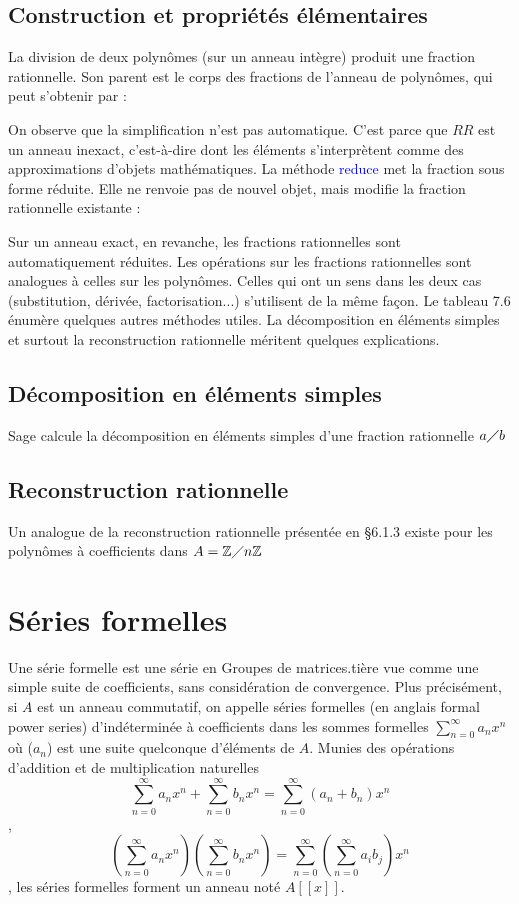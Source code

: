  \subsection{ Construction et propriétés élémentaires}
 La division de deux polynômes (sur un anneau intègre) produit une fraction rationnelle. Son parent est le corps des fractions de l’anneau de polynômes, qui peut s’obtenir par :
 \begin{python}
 \end{python}
 On observe que la simplification n’est pas automatique. C’est parce que $RR$ est un anneau inexact, c’est-à-dire dont les éléments s’interprètent comme des approximations d’objets mathématiques. La méthode \textcolor{blue}{reduce} met la fraction sous forme réduite. Elle ne renvoie pas de nouvel objet, mais modifie la fraction rationnelle existante :
 \begin{python}
 \end{python}
Sur un anneau exact, en revanche, les fractions rationnelles sont automatiquement réduites. Les opérations sur les fractions rationnelles sont analogues à celles sur les polynômes. Celles qui ont un sens dans les deux cas (substitution, dérivée, factorisation...) s’utilisent de la même façon. Le tableau 7.6 énumère quelques autres
méthodes utiles. La décomposition en éléments simples et surtout la reconstruction
rationnelle méritent quelques explications.
 \subsection{Décomposition en éléments simples}
 Sage calcule la décomposition en éléments simples d’une fraction rationnelle $a \diagup b$
 \subsection{Reconstruction rationnelle}
 Un analogue de la reconstruction rationnelle présentée en §6.1.3 existe pour les
polynômes à coefficients dans $A = \mathbb{Z} \diagup n\mathbb{Z}$
 \section{Séries formelles}
 Une série formelle est une série en Groupes de matrices.tière vue comme une simple suite de coefficients, sans considération de convergence. Plus précisément, si $A$ est un anneau commutatif, on appelle séries formelles (en anglais formal  power series) d’indéterminée  à coefficients dans  les sommes formelles $\sum_{n=0}^{\infty} a_{n}x^{n}$ où ($a_{n}$) est une suite quelconque d’éléments de $A$. Munies des opérations d’addition et de multiplication naturelles
\[
 \sum_{n=0}^{\infty} a_{n}x^{n} + \sum_{n=0}^{\infty} b_{n}x^{n} = \sum_{n=0}^{\infty} \left(a_{n}+b_{n}\right) x^{n} 
 \],
\[
 \left(\sum_{n=0}^{\infty} a_{n}x^{n}\right) \left(\sum_{n=0}^{\infty} b_{n}x^{n}\right) =  \sum_{n=0}^{\infty} \left( \sum_{n=0}^{\infty} a_{i}b_{j}\right)x^{n}
\], les séries formelles forment un anneau noté $A\left[ \left[ x\right] \right] $.\\

